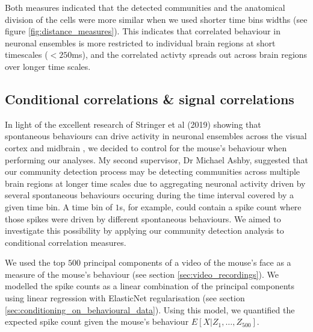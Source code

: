   Both measures indicated that the detected communities and the anatomical division of the cells were more similar when we used shorter time bins widths (see figure \ref{fig:distance_measures}). This indicates that correlated behaviour in neuronal ensembles is more restricted to individual brain regions at short timescales ($<250$ms), and the correlated activty spreads out across brain regions over longer time scales.

  \subsection{Conditional correlations \& signal correlations}
  In light of the excellent research of Stringer et al (2019) showing that spontaneous behaviours can drive activity in neuronal ensembles across the visual cortex and midbrain \parencite{stringer}, we decided to control for the mouse's behaviour when performing our analyses. My second supervisor, Dr Michael Ashby, suggested that our community detection process may be detecting communities across multiple brain regions at longer time scales due to aggregating neuronal activity driven by several spontaneous behaviours occuring during the time interval covered by a given time bin. A time bin of $1$s, for example, could contain a spike count where those spikes were driven by different spontaneous behaviours. We aimed to investigate this possibility by applying our community detection analysis to conditional correlation measures.

  We used the top $500$ principal components of a video of the mouse's face as a measure of the mouse's behaviour (see section \ref{sec:video_recordings}). We modelled the spike counts as a linear combination of the principal components using linear regression with ElasticNet regularisation (see section \ref{sec:conditioning_on_behavioural_data}). Using this model, we quantified the expected spike count given the mouse's behaviour $E[X|Z_1, \dots ,Z_{500}]$.


